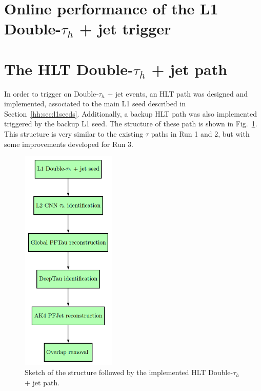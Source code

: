\documentclass[../main.tex]{subfiles}
\begin{document}
\section{Online performance of the L1 Double-$\tau_h$ + jet trigger}







\section{The HLT Double-$\tau_h$ + jet path}
\label{hh:sec:hlt_doubletaujet}

In order to trigger on Double-$\tau_h$ + jet events, an HLT path was designed and implemented, associated to the main L1 seed described in Section~\ref{hh:sec:l1seeds}. Additionally, a backup HLT path was also implemented triggered by the backup L1 seed. The structure of these path is shown in Fig.~\ref{hh:fig:hlt_path}. This structure is very similar to the existing $\tau$ paths in Run 1 and 2, but with some improvements developed for Run 3.

\begin{figure}
\begin{center}
\includegraphics[width=0.4\textwidth]{Images/HLT_Path}
\end{center}
\caption{Sketch of the structure followed by the implemented HLT Double-$\tau_h$ + jet path.}
\label{hh:fig:hlt_path}
\end{figure}
\end{document}
